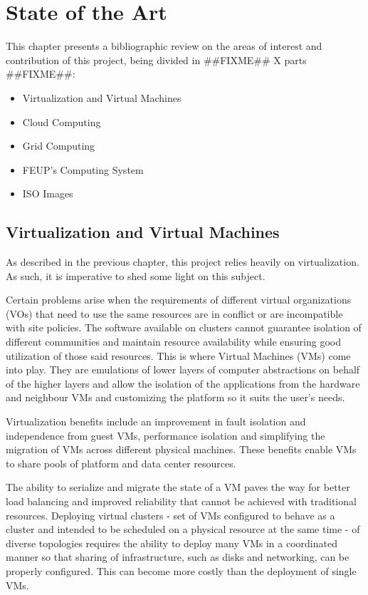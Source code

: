 \chapter{State of the Art}\label{chap:sota}

This chapter presents a bibliographic review on the areas of interest and contribution of this project, being divided in ##FIXME## X parts ##FIXME##:

\begin{itemize}
	\item Virtualization and Virtual Machines
	\item Cloud Computing
	\item Grid Computing
	\item FEUP's Computing System
	\item ISO Images
\end{itemize}

\section{Virtualization and Virtual Machines}\label{sec:virtualization_and_virtual_machines}

As described in the previous chapter, this project relies heavily on virtualization. As such, it is imperative to shed some light on this subject.

Certain problems arise when the requirements of different virtual organizations (VOs) that need to use the same resources are in conflict or are incompatible with site policies. The software available on clusters cannot guarantee isolation of different communities and maintain resource availability while ensuring good utilization of those said resources. This is where Virtual Machines (VMs) come into play. They are emulations of lower layers of computer abstractions on behalf of the higher layers and allow the isolation of the applications from the hardware and neighbour VMs and customizing the platform so it suits the user's needs. \cite{clusters-grid, Zhang05virtualcluster}

Virtualization benefits include an improvement in fault isolation and independence from guest VMs, performance isolation and simplifying the migration of VMs across different physical machines. These benefits enable VMs to share pools of platform and data center resources. \cite{virtualpower}

The ability to serialize and migrate the state of a VM paves the way for better load balancing and improved reliability that cannot be achieved with traditional resources. Deploying virtual clusters - set of VMs configured to behave as a cluster and intended to be scheduled on a physical resource at the same time \cite{Zhang05virtualcluster} -  of diverse topologies requires the ability to deploy many VMs in a coordinated manner so that sharing of infrastructure, such as disks and networking, can be properly configured. This can become more costly than the deployment of single VMs. 

